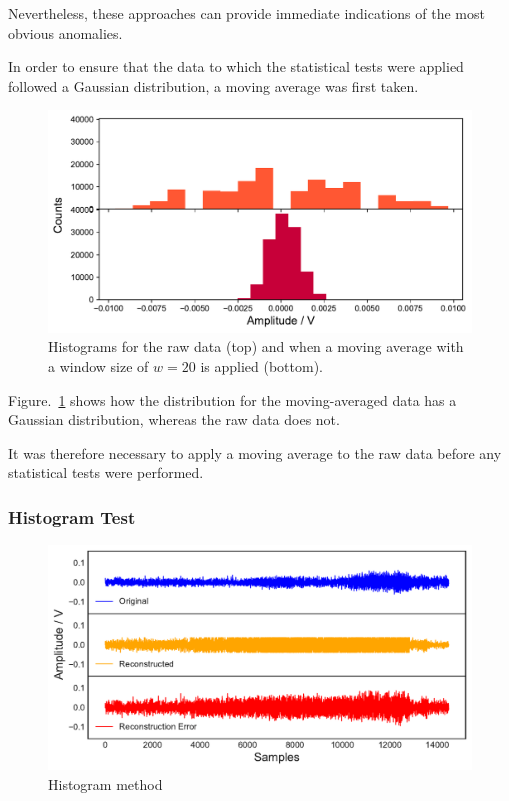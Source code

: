 Nevertheless, these approaches can provide immediate indications of the most obvious anomalies. 

In order to ensure that the data to which the statistical tests were applied followed a Gaussian distribution, a moving average was first taken.

\begin{figure}[t]
    \includegraphics[width=1.0\textwidth]{fig/moving_av_hist.pdf}
    \caption[Moving Average Histogram]{Histograms for the raw data (top) and when a moving average with a window size of $w=20$ is applied (bottom).}
    \label{fig:move_av_hist}
\end{figure}

Figure.~\ref{fig:move_av_hist} shows how the distribution for the moving-averaged data has a Gaussian distribution, whereas the raw data does not.

It was therefore necessary to apply a moving average to the raw data before any statistical tests were performed.

\subsubsection{Histogram Test}

\begin{figure}[t]
    \includegraphics[width=1.0\textwidth]{fig/histogram.pdf}
    \caption[Histogram]{Histogram method}
    \label{fig:histogram}
\end{figure}

